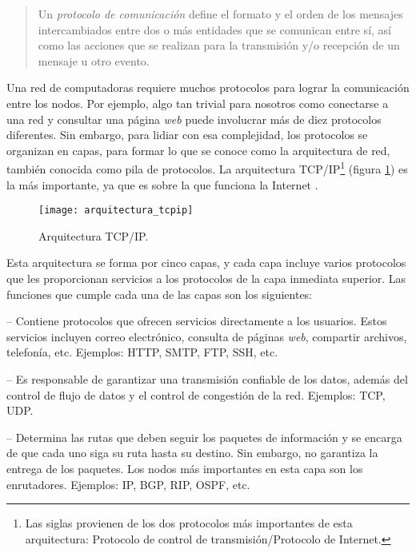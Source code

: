 \begin{quotation}
Un \textit{protocolo de comunicación} define el formato y el orden de los
mensajes intercambiados entre dos o más entidades que se comunican entre sí,
así como las acciones que se realizan para la transmisión y/o recepción de un
mensaje u otro \mbox{evento}.
\end{quotation}

Una red de computadoras requiere muchos protocolos para lograr la comunicación
entre los nodos. Por ejemplo, algo tan trivial para nosotros como conectarse a
una red y consultar una página \textit{web} puede involucrar más de diez
protocolos diferentes. Sin embargo, para lidiar con esa complejidad, los
protocolos se organizan en capas, para formar lo que se conoce como la
arquitectura de red, también conocida como pila de protocolos. La arquitectura
TCP/IP\footnote{Las siglas provienen de los dos protocolos más importantes de
esta arquitectura: Protocolo de control de transmisión/Protocolo de Internet.}
(figura \ref{fig:arquitectura_tcpip}) es la más importante, ya que es sobre la
que funciona la Internet \cite{Kurose2013}.

\begin{figure}[th]
\centering
\texttt{[image: arquitectura\_tcpip]}
\decoRule
\caption[Arquitectura TCP/IP]{Arquitectura TCP/IP.}
\label{fig:arquitectura_tcpip}
\end{figure}

Esta arquitectura se forma por cinco capas, y cada capa incluye varios
protocolos que les proporcionan servicios a los protocolos de la capa inmediata
superior. Las funciones que cumple cada una de las capas son los siguientes:

 -- Contiene protocolos que ofrecen servicios
directamente a los usuarios. Estos servicios incluyen correo electrónico,
consulta de páginas \textit{web}, compartir archivos, telefonía, etc. Ejemplos:
HTTP, SMTP, FTP, SSH, etc.

 -- Es responsable de garantizar una transmisión
confiable de los datos, además del control de flujo de datos y el control de
congestión de la red. Ejemplos: TCP, UDP.

 -- Determina las rutas que deben seguir los paquetes de
información y se encarga de que cada uno siga su ruta hasta su destino. Sin
embargo, no garantiza la entrega de los paquetes. Los nodos más importantes en
esta capa son los enrutadores. Ejemplos: IP, BGP, RIP, OSPF, etc.

